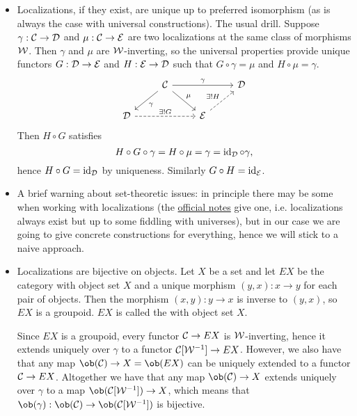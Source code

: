 \begin{itemize}
    \item Localizations, if they exist, are unique up to preferred isomorphism (as is always the case with universal constructions). The usual drill. Suppose $\gamma:\mathcal{C}\to\mathcal{D}$ and $\mu:\mathcal{C}\to\mathcal{E}$ are two localizations at the same class of morphisms $\mathcal{W}$. Then $\gamma$ and $\mu$ are $\mathcal{W}$-inverting, so the universal properties provide unique functors $G:\mathcal{D}\to\mathcal{E}$ and $H:\mathcal{E}\to\mathcal{D}$ such that $G\circ\gamma=\mu$ and $H\circ\mu=\gamma$.
    \[
    \begin{tikzcd}
     & \Cc \ar[dr,"\mu"] \ar[dl,"\gamma"] \ar[rr,"\gamma"] & & \Dd\\
     \Dd \ar[rr,dashed,"\exists!G"] & & \Ee \ar[ur,dashed,"\exists!H"] &
    \end{tikzcd}
    \]
    Then $H\circ G$ satisfies
    \[H\circ G\circ\gamma=H\circ\mu=\gamma=\operatorname{id}_{\mathcal{D}}\circ\gamma,\]
    hence $H\circ G=\operatorname{id}_{\mathcal{D}}$ by uniqueness. Similarly $G\circ H=\operatorname{id}_{\mathcal{E}}$.
    
    \item A brief warning about set-theoretic issues: in principle there may be some when working with localizations (the \href{https://www.math.uni-bonn.de/people/schwede/sset_vs_spaces.pdf}{official notes} give one, i.e. localizations always exist but up to some fiddling with universes), but in our case we are going to give concrete constructions for everything, hence we will stick to a naive approach.
    
    \item Localizations are bijective on objects. Let $X$ be a set and let $EX$ be the category with object set $X$ and a unique morphism $(y,x):x\to y$ for each pair of objects. Then the morphism $(x,y):y\to x$ is inverse to $(y,x)$, so $EX$ is a groupoid. $EX$ is called the  with object set $X$.
    
    Since $EX$ is a groupoid, every functor $\mathcal{C}\to EX$ is $\mathcal{W}$-inverting, hence it extends uniquely over $\gamma$ to a functor $\mathcal{C}[\mathcal{W}^{-1}]\to EX$. However, we also have that any map $\ob(\Cc)\to X=\ob(EX)$ can be uniquely extended to a functor $\mathcal{C}\to EX$. Altogether we have that any map $\ob(\Cc)\to X$ extends uniquely over $\gamma$ to a map $\ob(\Cc[\Ww^\inv])\to X$, which means that $\ob(\gamma):\ob(\Cc)\to\ob(\Cc[\Ww^\inv])$ is bijective.
    

\end{itemize}
